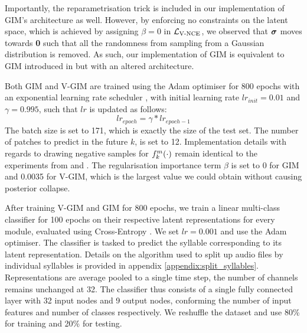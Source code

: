 		
		Importantly, the reparametrisation trick is included in our implementation of GIM's architecture as well. However, by enforcing no constraints on the latent space, which is achieved by assigning $\beta = 0$ in $\mathcal{L}_{\text{V-NCE}}$, we observed that $\bm{\sigma}$ moves towards \textbf{0} such that all the randomness from sampling from a Gaussian distribution is removed. As such, our implementation of GIM is equivalent to GIM introduced in \cite{lowePuttingEndEndtoEnd2020} but with an altered architecture.
		
		Both GIM and V-GIM are trained using the Adam optimiser for 800 epochs with an exponential learning rate scheduler \cite{bhargavladGuidePytorchLearning}, with initial learning rate $lr_{init} = 0.01$ and $\gamma=0.995$, such that $lr$ is updated as follows:
		$$lr_{epoch} = \gamma * lr_{epoch - 1}$$
		The batch size is set to 171, which is exactly the size of the test set. The number of patches to predict in the future $k$, is set to 12. Implementation details with regards to drawing negative samples for $f_k^m(\cdot)$ remain identical to the experiments from \cite{oordRepresentationLearningContrastive2019} and \cite{lowePuttingEndEndtoEnd2020}. The regularisation importance term $\beta$ is set to 0 for GIM and 0.0035 for V-GIM, which is the largest value we could obtain without causing posterior collapse.

	
		After training V-GIM and GIM for 800 epochs, we train a linear multi-class classifier for 100 epochs on their respective latent representations for every module, evaluated using Cross-Entropy \cite{hoRealWorldWeightCrossEntropyLoss2020}. We set $lr=0.001$ and use the Adam optimiser. The classifier is tasked to predict the syllable corresponding to its latent representation. Details on the algorithm used to split up audio files by individual syllables is provided in appendix \ref{appendix:split_syllables}. Representations are average pooled to a single time step, the number of channels remains unchanged at 32. The classifier thus consists of a single fully connected layer with 32 input nodes and 9 output nodes, conforming the number of input features and number of classes respectively. We reshuffle the dataset and use 80\% for training and 20\% for testing.

